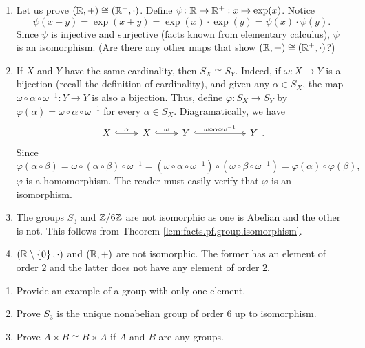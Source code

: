\documentclass[11pt,a4paper]{article}
\begin{document}
\begin{exa}
\begin{enumerate}[label=(\roman*)]
    \item Let us prove \(\left( \mathbb{R}, +  \right)\cong \left( \mathbb{R}^+, \cdot \right)\).
    Define \(\psi\colon \mathbb{R}\to \mathbb{R}^+:x\mapsto \exp(x)\). 
    Notice \[\psi(x + y) = \exp(x+y) = \exp(x)\cdot\exp(y) = \psi(x)\cdot\psi(y).\]
    Since \(\psi\) is injective and surjective (facts known from elementary calculus), \(\psi\) is an isomorphism.
    (Are there any other maps that show \(\left( \mathbb{R}, +  \right)\cong \left( \mathbb{R}^+, \cdot \right)\)?)
    \item If \(X\) and \(Y\) have the same cardinality, then \(S_X\cong S_Y\).
    Indeed, if \(\omega \colon X\to Y\) is a bijection (recall the definition of cardinality), and
    given any \(\alpha\in S_X\), 
    the map \(\omega \circ \alpha\circ \omega^{-1}\colon Y\to Y \) is also a bijection.
    Thus, define \(\varphi\colon S_X\to S_Y\) by \(\varphi(\alpha) = \omega \circ \alpha\circ \omega^{-1}\) for every \(\alpha\in S_X\).
    Diagramatically, we have
    \[\begin{tikzcd}
X \arrow[r, "\alpha", two heads, hook] & X \arrow[r, "\omega", two heads, hook] & Y \arrow[r, "\omega\circ \alpha\circ \omega^{-1}", two heads, hook] &[3em] Y
\end{tikzcd}.\]
    Since \[\varphi(\alpha\circ \beta) = \omega \circ (\alpha\circ\beta)\circ \omega^{-1}= (\omega \circ \alpha\circ \omega^{-1})\circ(\omega\circ\beta\circ \omega^{-1}) = \varphi(\alpha)\circ \varphi(\beta),\]
    \(\varphi\) is a homomorphism.
    The reader must easily verify that \(\varphi\) is an isomorphism.

    \item The groups \(S_3\) and \(\mathbb{Z}/6\mathbb{Z}\) are not isomorphic as one is Abelian and the other is not. This follows from Theorem \ref{lem:facts.pf.group.isomorphism}.
    
    \item \(\left( \mathbb{R}\setminus \left\{ 0 \right\}, \cdot \right) \) and \(\left( \mathbb{R},+ \right)\) are not isomorphic.
    The former  has an element of  order \(2\) and the latter does not have any element of order \(2\).
\end{enumerate}
\end{exa}

\begin{eje}
\begin{enumerate}[label=(\roman*)]
    \item Provide an example of a group with only one element.
    \item Prove \(S_3\) is the unique nonabelian group of order \(6\) up to isomorphism.
    \item Prove \(A\times B\cong B\times A\) if \(A\) and \(B\) are any groups.
\end{enumerate}
\end{eje}
\end{document}
